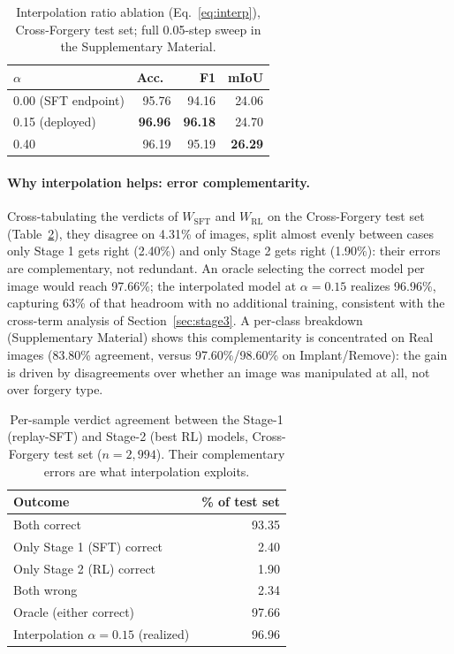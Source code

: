 \documentclass[10pt,twocolumn,letterpaper]{article}
\begin{document}
\begin{table}[t]
\centering
\small
\caption{Interpolation ratio ablation (Eq.~\ref{eq:interp}), Cross-Forgery test set; full 0.05-step sweep in the Supplementary Material.}
\label{tab:ablation-interp}
\begin{tabular}{lrrr}
\toprule
$\alpha$ & Acc.\ & F1 & mIoU \\
\midrule
0.00 (SFT endpoint) & 95.76 & 94.16 & 24.06 \\
0.15 (deployed) & \textbf{96.96} & \textbf{96.18} & 24.70 \\
0.40 & 96.19 & 95.19 & \textbf{26.29} \\
\bottomrule
\end{tabular}
\end{table}

\paragraph{Why interpolation helps: error complementarity.} Cross-tabulating the verdicts of $W_{\mathrm{SFT}}$ and $W_{\mathrm{RL}}$ on the Cross-Forgery test set (Table~\ref{tab:overlap}), they disagree on 4.31\% of images, split almost evenly between cases only Stage 1 gets right (2.40\%) and only Stage 2 gets right (1.90\%): their errors are complementary, not redundant. An oracle selecting the correct model per image would reach 97.66\%; the interpolated model at $\alpha{=}0.15$ realizes 96.96\%, capturing 63\% of that headroom with no additional training, consistent with the cross-term analysis of Section~\ref{sec:stage3}. A per-class breakdown (Supplementary Material) shows this complementarity is concentrated on Real images (83.80\% agreement, versus 97.60\%/98.60\% on Implant/Remove): the gain is driven by disagreements over whether an image was manipulated at all, not over forgery type.

\begin{table}[t]
\centering
\small
\caption{Per-sample verdict agreement between the Stage-1 (replay-SFT) and Stage-2 (best RL) models, Cross-Forgery test set ($n{=}2{,}994$). Their complementary errors are what interpolation exploits.}
\label{tab:overlap}
\begin{tabular}{lr}
\toprule
Outcome & \% of test set \\
\midrule
Both correct & 93.35 \\
Only Stage 1 (SFT) correct & 2.40 \\
Only Stage 2 (RL) correct & 1.90 \\
Both wrong & 2.34 \\
\midrule
Oracle (either correct) & 97.66 \\
Interpolation $\alpha{=}0.15$ (realized) & 96.96 \\
\bottomrule
\end{tabular}
\end{table}
\end{document}
